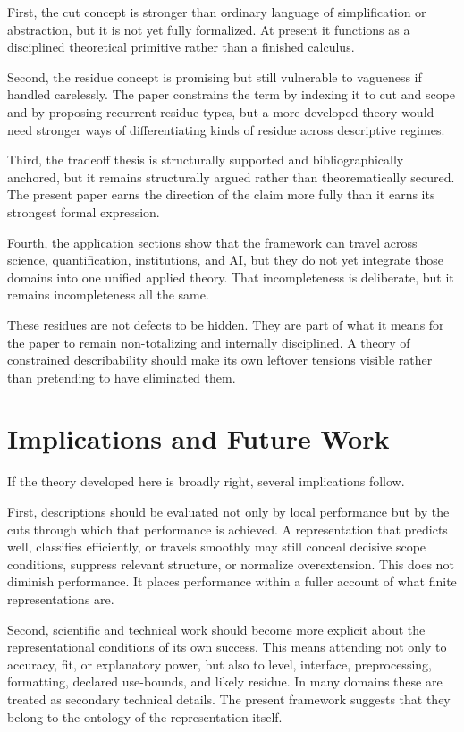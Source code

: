 \documentclass[11pt]{article}
\begin{document}
First, the cut concept is stronger than ordinary language of simplification or abstraction, but it is not yet fully formalized. At present it functions as a disciplined theoretical primitive rather than a finished calculus.

Second, the residue concept is promising but still vulnerable to vagueness if handled carelessly. The paper constrains the term by indexing it to cut and scope and by proposing recurrent residue types, but a more developed theory would need stronger ways of differentiating kinds of residue across descriptive regimes.

Third, the tradeoff thesis is structurally supported and bibliographically anchored, but it remains structurally argued rather than theorematically secured. The present paper earns the direction of the claim more fully than it earns its strongest formal expression.

Fourth, the application sections show that the framework can travel across science, quantification, institutions, and AI, but they do not yet integrate those domains into one unified applied theory. That incompleteness is deliberate, but it remains incompleteness all the same.

These residues are not defects to be hidden. They are part of what it means for the paper to remain non-totalizing and internally disciplined. A theory of constrained describability should make its own leftover tensions visible rather than pretending to have eliminated them.

\section{Implications and Future Work}

If the theory developed here is broadly right, several implications follow.

First, descriptions should be evaluated not only by local performance but by the cuts through which that performance is achieved. A representation that predicts well, classifies efficiently, or travels smoothly may still conceal decisive scope conditions, suppress relevant structure, or normalize overextension. This does not diminish performance. It places performance within a fuller account of what finite representations are. \cite{frigg_nguyen_scientific_representation_sep,mitchell_model_cards,gebru_datasheets,nist_explainable_ai}

Second, scientific and technical work should become more explicit about the representational conditions of its own success. This means attending not only to accuracy, fit, or explanatory power, but also to level, interface, preprocessing, formatting, declared use-bounds, and likely residue. In many domains these are treated as secondary technical details. The present framework suggests that they belong to the ontology of the representation itself. \cite{frigg_hartmann_models_sep,frigg_nguyen_scientific_representation_sep,mitchell_model_cards,gebru_datasheets}
\end{document}
